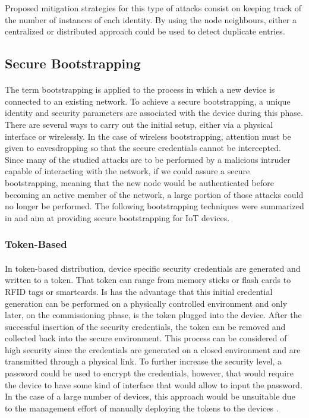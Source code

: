 Proposed mitigation strategies for this type of attacks consist on keeping track of the number of instances of each identity. By using the node neighbours, either a centralized or distributed approach could be used to detect duplicate entries.

\subsection{Secure Bootstrapping}
\label{sec:secure_bootstrapping}
\paragraph{}
The term bootstrapping is applied to the process in which a new device is connected to an existing network. To achieve a secure bootstrapping, a unique identity and security parameters are associated with the device during this phase. There are several ways to carry out the initial setup, either via a physical interface or wirelessly. In the case of wireless bootstrapping, attention must be given to eavesdropping so that the secure credentials cannot be intercepted.\\
Since many of the studied attacks are to be performed by a malicious intruder capable of interacting with the network, if we could assure a secure bootstrapping, meaning that the new node would be authenticated before becoming an active member of the network, a large portion of those attacks could no longer be performed. The following bootstrapping techniques were summarized in \cite{Fischer2012} and aim at providing secure bootstrapping for \ac{IoT} devices.

\subsubsection{Token-Based}
\paragraph{}
In token-based distribution, device specific security credentials are generated and written to a token. That token can range from memory sticks or flash cards to \ac{RFID} tags or smartcards. Is has the advantage that this initial credential generation can be performed on a physically controlled environment and only later, on the commissioning phase, is the token plugged into the device. After the successful insertion of the security credentials, the token can be removed and collected back into the secure environment. This process can be considered of high security since the credentials are generated on a closed environment and are transmitted through a physical link. To further increase the security level, a password could be used to encrypt the credentials, however, that would require the device to have some kind of interface that would allow to input the password. In the case of a large number of devices, this approach would be unsuitable due to the management effort of manually deploying the tokens to the devices \cite{Fischer2012}.

